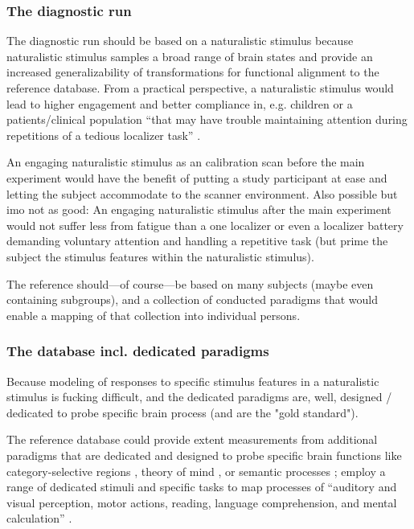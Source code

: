 \subsubsection{The diagnostic run}
%
The diagnostic run should be based on a naturalistic stimulus because
naturalistic stimulus samples a broad range of brain states
\citep[cf.][]{guntupalli2016model, haxby2011common} and provide an increased
generalizability of transformations for functional alignment to the reference
database.
%
From a practical perspective, a naturalistic stimulus would lead to higher
engagement and better compliance \citep{vanderwal2015inscapes,
eickhoff2020towards} in, e.g. children or a patients/clinical population ``that
may have trouble maintaining attention during repetitions of a tedious localizer
task'' \citep{jiahui2020predicting}.

An engaging naturalistic stimulus as an calibration scan before the main
experiment would have the benefit of putting a study participant at ease and
letting the subject accommodate to the scanner environment.
%
Also possible but imo not as good: An engaging naturalistic stimulus after the
main experiment would not suffer less from fatigue than a one localizer or even
a localizer battery demanding voluntary attention and handling a repetitive task
(but prime the subject the stimulus features within the naturalistic stimulus).

%
The reference should---of course---be based on many subjects (maybe even
containing subgroups), and a collection of conducted paradigms that would enable
a mapping of that collection into individual persons.


\subsubsection{The database incl. dedicated paradigms}


%
Because modeling of responses to specific stimulus features in a naturalistic
stimulus is fucking difficult, and the dedicated paradigms are, well, designed /
dedicated to probe specific brain process (and are the "gold standard").

%
The reference database could provide extent measurements from additional
paradigms that are dedicated and designed to probe specific brain functions like
category-selective regions \citep{stigliani2015temporal}, theory of mind
\citep{spunt2014validating}, or semantic processes \citep{fedorenko2010new,
fernandez2001language};
%
employ a range of dedicated stimuli and specific tasks to map processes of
``auditory and visual perception, motor actions, reading, language
comprehension, and mental calculation'' \citep{pinel2007fast}.


